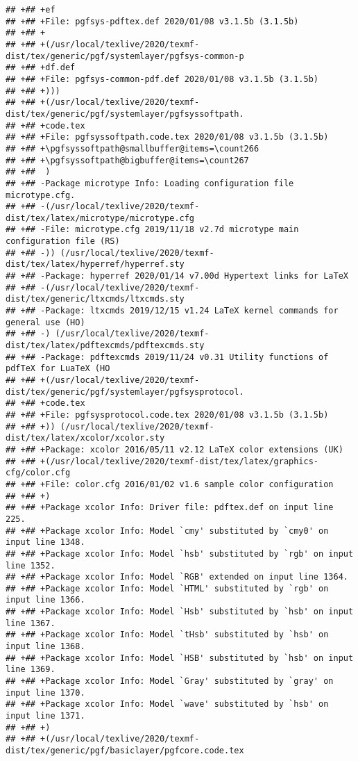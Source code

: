 \documentclass[ignorenonframetext,]{beamer}
\begin{document}
\begin{verbatim}
## +## +ef
## +## +File: pgfsys-pdftex.def 2020/01/08 v3.1.5b (3.1.5b)
## +## +
## +## +(/usr/local/texlive/2020/texmf-dist/tex/generic/pgf/systemlayer/pgfsys-common-p
## +## +df.def
## +## +File: pgfsys-common-pdf.def 2020/01/08 v3.1.5b (3.1.5b)
## +## +)))
## +## +(/usr/local/texlive/2020/texmf-dist/tex/generic/pgf/systemlayer/pgfsyssoftpath.
## +## +code.tex
## +## +File: pgfsyssoftpath.code.tex 2020/01/08 v3.1.5b (3.1.5b)
## +## +\pgfsyssoftpath@smallbuffer@items=\count266
## +## +\pgfsyssoftpath@bigbuffer@items=\count267
## +##  )
## +## -Package microtype Info: Loading configuration file microtype.cfg.
## +## -(/usr/local/texlive/2020/texmf-dist/tex/latex/microtype/microtype.cfg
## +## -File: microtype.cfg 2019/11/18 v2.7d microtype main configuration file (RS)
## +## -)) (/usr/local/texlive/2020/texmf-dist/tex/latex/hyperref/hyperref.sty
## +## -Package: hyperref 2020/01/14 v7.00d Hypertext links for LaTeX
## +## -(/usr/local/texlive/2020/texmf-dist/tex/generic/ltxcmds/ltxcmds.sty
## +## -Package: ltxcmds 2019/12/15 v1.24 LaTeX kernel commands for general use (HO)
## +## -) (/usr/local/texlive/2020/texmf-dist/tex/latex/pdftexcmds/pdftexcmds.sty
## +## -Package: pdftexcmds 2019/11/24 v0.31 Utility functions of pdfTeX for LuaTeX (HO
## +## +(/usr/local/texlive/2020/texmf-dist/tex/generic/pgf/systemlayer/pgfsysprotocol.
## +## +code.tex
## +## +File: pgfsysprotocol.code.tex 2020/01/08 v3.1.5b (3.1.5b)
## +## +)) (/usr/local/texlive/2020/texmf-dist/tex/latex/xcolor/xcolor.sty
## +## +Package: xcolor 2016/05/11 v2.12 LaTeX color extensions (UK)
## +## +(/usr/local/texlive/2020/texmf-dist/tex/latex/graphics-cfg/color.cfg
## +## +File: color.cfg 2016/01/02 v1.6 sample color configuration
## +## +)
## +## +Package xcolor Info: Driver file: pdftex.def on input line 225.
## +## +Package xcolor Info: Model `cmy' substituted by `cmy0' on input line 1348.
## +## +Package xcolor Info: Model `hsb' substituted by `rgb' on input line 1352.
## +## +Package xcolor Info: Model `RGB' extended on input line 1364.
## +## +Package xcolor Info: Model `HTML' substituted by `rgb' on input line 1366.
## +## +Package xcolor Info: Model `Hsb' substituted by `hsb' on input line 1367.
## +## +Package xcolor Info: Model `tHsb' substituted by `hsb' on input line 1368.
## +## +Package xcolor Info: Model `HSB' substituted by `hsb' on input line 1369.
## +## +Package xcolor Info: Model `Gray' substituted by `gray' on input line 1370.
## +## +Package xcolor Info: Model `wave' substituted by `hsb' on input line 1371.
## +## +)
## +## +(/usr/local/texlive/2020/texmf-dist/tex/generic/pgf/basiclayer/pgfcore.code.tex

\end{verbatim}
\end{document}
